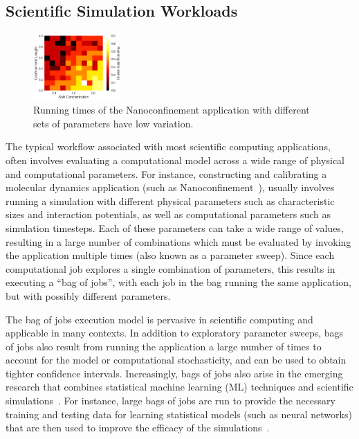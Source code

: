 \vspace*{\subsecspace}
\subsection{Scientific Simulation Workloads}


\begin{figure}[t]
  \centering 
  \includegraphics[width=0.3\textwidth]{../graphs/hmap.png}
    \vspace*{\myfigspace}
  \caption{Running times of the Nanoconfinement application with different sets of parameters have low variation.}
  \label{fig:heatmap}
  \vspace*{\myfigspace}
\end{figure}


The typical workflow associated with most scientific computing applications, often involves evaluating a computational model across a wide range of physical and computational parameters. 
For instance, constructing and calibrating a molecular dynamics application (such as Nanoconfinement~\cite{jcs2}), usually involves running a simulation with different physical parameters such as characteristic sizes and interaction potentials, as well as computational parameters such as simulation timesteps. 
Each of these parameters can take a wide range of values, resulting in a large number of combinations which must be evaluated by invoking the application multiple times (also known as a parameter sweep). 
Since each computational job explores a single combination of parameters, this results in executing a ``bag of jobs'', with each job in the bag running the same application, but with possibly different parameters.


The bag of jobs execution model is pervasive in scientific computing and applicable in many contexts.
In addition to exploratory parameter sweeps, bags of jobs also result from running the application a large number of times to account for the model or computational stochasticity, and can be used to obtain tighter confidence intervals. 
Increasingly, bags of jobs also arise in the emerging research that combines statistical machine learning (ML) techniques and scientific simulations~\cite{ml.atomic2017,melko2017,sam2017}. %
For instance, large bags of jobs are run to provide the necessary training and testing data for learning statistical models (such as neural networks) that are then used to improve the efficacy of the simulations~\cite{jcs2}.


